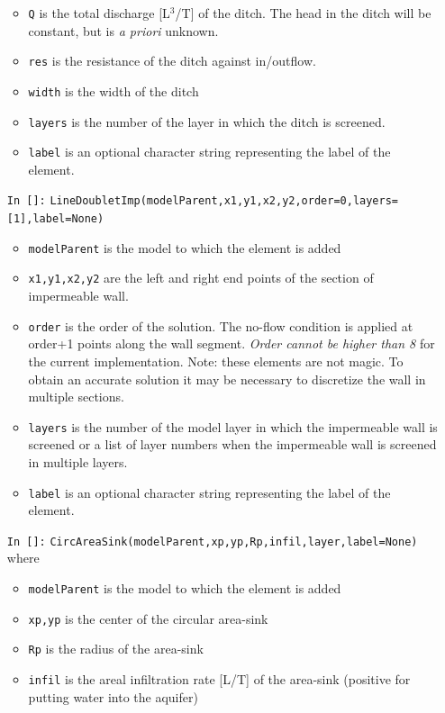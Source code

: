 \documentclass [10pt,letterpaper] {article}
\begin{document}
\begin{itemize}
\begin{itemize}
    \item {\tt Q} is the total discharge [L$^3$/T] of the ditch. The head in
    the ditch will be constant, but is {\it a priori} unknown.
    \item {\tt res} is the resistance of the ditch against in/outflow.
    \item {\tt width} is the width of the ditch
    \item {\tt layers} is the number of the layer in which the ditch is
    screened.
    \item {\tt label} is an optional character string representing the label of the element.
    \end{itemize}
\item[{\tt In []:}] {\tt LineDoubletImp(modelParent,x1,y1,x2,y2,order=0,layers=[1],label=None)}
    \begin{itemize}
    \item {\tt modelParent} is the model to which the element is
    added
    \item {\tt x1,y1,x2,y2} are the left and right end points of
    the section of impermeable wall.
    \item {\tt order} is the order of the solution. The no-flow condition is applied at order+1 points
    along the wall segment. \emph{Order cannot be higher than 8} for the current implementation. Note: these elements
    are not magic. To obtain an accurate solution it may be necessary to discretize the wall in multiple sections.
    \item {\tt layers} is the number of the model layer in which the impermeable wall is screened or a list of layer numbers when the impermeable wall is screened in multiple layers. 
    \item {\tt label} is an optional character string representing the label of the element.
    \end{itemize}
\item[{\tt In []:}] {\tt CircAreaSink(modelParent,xp,yp,Rp,infil,layer,label=None)} where
    \begin{itemize}
    \item {\tt modelParent} is the model to which the element is
    added
    \item {\tt xp,yp} is the center of the circular area-sink
    \item {\tt Rp} is the radius of the area-sink
    \item {\tt infil} is the areal infiltration rate [L/T] of the
    area-sink (positive for putting water into the aquifer)

\end{itemize}
\end{itemize}
\end{document}

